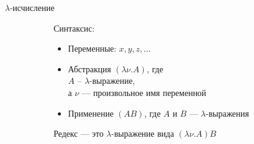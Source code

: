 \begin{frame}{$\lambda$-исчисление}
\begin{figure}[t]
  \begin{subfigure}[t]{0.35\textwidth}
    \vspace{-1em}
    Синтаксис:
    \begin{itemize}
      \item Переменные: $x,y,z,\dots$
      \item Абстракция $(\lambda \nu. A)$, где \\
      $A$ -- $\lambda$-выражение, \\
      а $\nu$ --- произвольное имя переменной
      \item Применение $(AB)$, где $A$ и $B$ --- $\lambda$-выражения
    \end{itemize}
    \begin{definition}{Редекс}
      --- это $\lambda$-выражение вида $(\lambda \nu. A)B$
    \end{definition}
  \end{subfigure}
\hspace{0.4cm}
  \begin{subfigure}[t]{0.55\textwidth}
  \end{subfigure}
\end{figure}
\end{frame}


